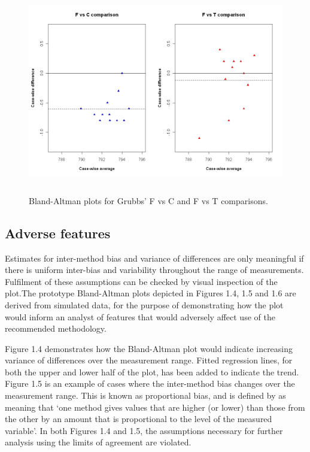 \documentclass[12pt, a4paper]{report}
\theoremstyle{plain}
\theoremstyle{definition}
\theoremstyle{remark}
\begin{document}
	\begin{figure}[h!]
		\begin{center}
			\includegraphics[height=90mm]{images/GrubbsDataTwoBAplots.jpeg}
			\caption{Bland-Altman plots for Grubbs' F vs C and F vs T comparisons.}\label{GrubbsDataTwoBAplots}
		\end{center}
	\end{figure}
	
	\newpage
	
	
	\subsection{Adverse features}
	
	Estimates for inter-method bias and variance of differences are only meaningful if there is uniform inter-bias and variability throughout the range of measurements. Fulfilment of these assumptions can be checked by visual inspection of the plot.The prototype Bland-Altman plots depicted in Figures 1.4, 1.5 and 1.6 are derived from simulated data, for the purpose of demonstrating how the plot would inform an analyst of features that would adversely affect use of the recommended methodology.
	
	Figure 1.4 demonstrates how the Bland-Altman plot would indicate
	increasing variance of differences over the measurement range.
	Fitted regression lines, for both the upper and lower half of the
	plot, has been added to indicate the trend. Figure 1.5 is an
	example of cases where the inter-method bias changes over the
	measurement range. This is known as proportional bias, and is
	defined by \citet{ludbrook97} as meaning that `one method gives values that are higher (or lower) than those from the other by an 	amount that is proportional to the level of the measured variable'. In both Figures 1.4 and 1.5, the assumptions necessary
	for further analysis using the limits of agreement are violated.
	
\end{document}
